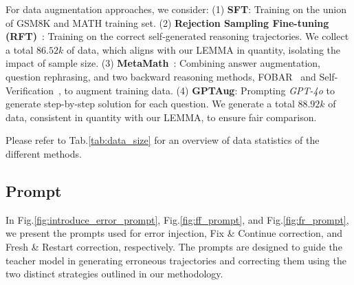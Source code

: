 For data augmentation approaches, we consider:
(1) \textbf{SFT}: Training on the union of GSM8K and MATH training set.
(2) \textbf{Rejection Sampling Fine-tuning (RFT)}~\cite{yuan2023scaling}: Training on the correct self-generated reasoning trajectories. 
We collect a total $86.52k$ of data, which aligns with our LEMMA in quantity, isolating the impact of sample size.
(3) \textbf{MetaMath}~\cite{yumetamath}: Combining answer augmentation, question rephrasing, and two backward reasoning methods, FOBAR~\cite{jiang2024forward} and Self-Verification~\cite{weng2023large}, to augment training data.
(4) \textbf{GPTAug}: Prompting \textit{GPT-4o} to generate step-by-step solution for each question. We generate a total $88.92k$ of data, consistent in quantity with our LEMMA, to ensure fair comparison.

Please refer to Tab.\ref{tab:data_size} for an overview of data statistics of the different methods.

\subsection{Prompt}
\label{sec:prompt}

In Fig.\ref{fig:introduce_error_prompt}, Fig.\ref{fig:ff_prompt}, and Fig.\ref{fig:fr_prompt}, we present the prompts used for error injection, Fix \& Continue correction, and Fresh \& Restart correction, respectively. The prompts are designed to guide the teacher model in generating erroneous trajectories and correcting them using the two distinct strategies outlined in our methodology. 

